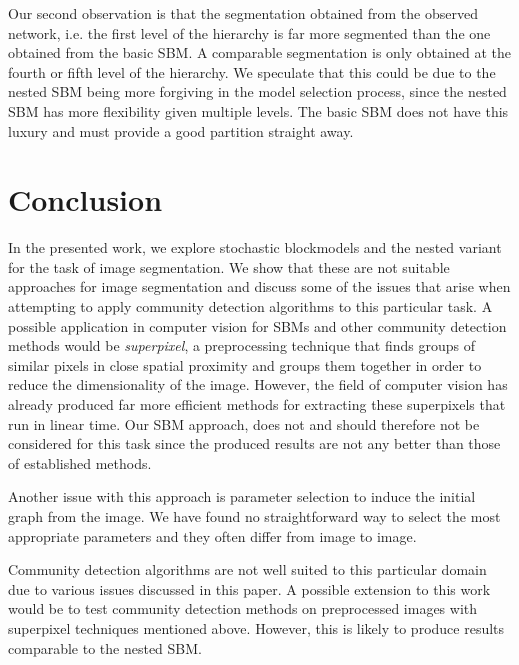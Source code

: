 \documentclass[conference]{IEEEtran}
\begin{document}
Our second observation is that the segmentation obtained from the observed network, i.e. the first level of the hierarchy is far more segmented than the one obtained from the basic SBM. A comparable segmentation is only obtained at the fourth or fifth level of the hierarchy. We speculate that this could be due to the nested SBM being more forgiving in the model selection process, since the nested SBM has more flexibility given multiple levels. The basic SBM does not have this luxury and must provide a good partition straight away.

\section{Conclusion}\label{conclusion}

In the presented work, we explore stochastic blockmodels and the nested variant for the task of image segmentation. We show that these are not suitable approaches for image segmentation and discuss some of the issues that arise when attempting to apply community detection algorithms to this particular task. A possible application in computer vision for SBMs and other community detection methods would be \textit{superpixel}, a preprocessing technique that finds groups of similar pixels in close spatial proximity and groups them together in order to reduce the dimensionality of the image. However, the field of computer vision has already produced far more efficient methods for extracting these superpixels that run in linear time. Our SBM approach, does not and should therefore not be considered for this task since the produced results are not any better than those of established methods.

Another issue with this approach is parameter selection to induce the initial graph from the image. We have found no straightforward way to select the most appropriate parameters and they often differ from image to image.

Community detection algorithms are not well suited to this particular domain due to various issues discussed in this paper. A possible extension to this work would be to test community detection methods on preprocessed images with superpixel techniques mentioned above. However, this is likely to produce results comparable to the nested SBM.

\end{document}
